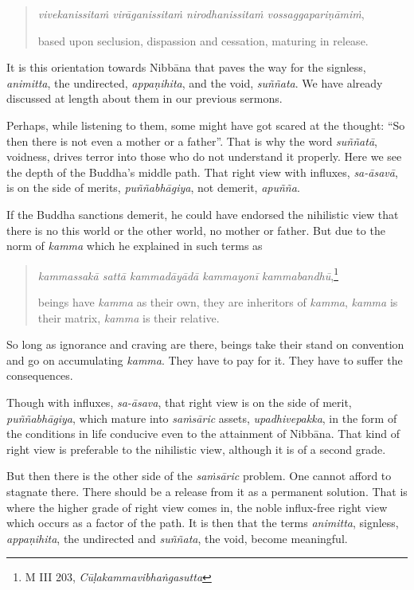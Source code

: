 \begin{quote}
\emph{vivekanissitaṁ virāganissitaṁ nirodhanissitaṁ vossaggapariṇāmiṁ},

based upon seclusion, dispassion and cessation, maturing in release.
\end{quote}

It is this orientation towards Nibbāna that paves the way for the signless, \emph{animitta}, the undirected, \emph{appaṇihita}, and the void, \emph{suññata}. We have already discussed at length about them in our previous sermons.

Perhaps, while listening to them, some might have got scared at the thought: ``So then there is not even a mother or a father''. That is why the word \emph{suññatā}, voidness, drives terror into those who do not understand it properly. Here we see the depth of the Buddha's middle path. That right view with influxes, \emph{sa-āsavā}, is on the side of merits, \emph{puññabhāgiya}, not demerit, \emph{apuñña}.

If the Buddha sanctions demerit, he could have endorsed the nihilistic view that there is no this world or the other world, no mother or father. But due to the norm of \emph{kamma} which he explained in such terms as

\begin{quote}
\emph{kammassakā sattā kammadāyādā kammayonī kammabandhū},\footnote{M III 203, \emph{Cūḷakammavibhaṅgasutta}}

beings have \emph{kamma} as their own, they are inheritors of \emph{kamma}, \emph{kamma} is their matrix, \emph{kamma} is their relative.
\end{quote}

So long as ignorance and craving are there, beings take their stand on convention and go on accumulating \emph{kamma}. They have to pay for it. They have to suffer the consequences.

Though with influxes, \emph{sa-āsava}, that right view is on the side of merit, \emph{puññabhāgiya}, which mature into \emph{saṁsāric} assets, \emph{upadhivepakka}, in the form of the conditions in life conducive even to the attainment of Nibbāna. That kind of right view is preferable to the nihilistic view, although it is of a second grade.

But then there is the other side of the \emph{saṁsāric} problem. One cannot afford to stagnate there. There should be a release from it as a permanent solution. That is where the higher grade of right view comes in, the noble influx-free right view which occurs as a factor of the path. It is then that the terms \emph{animitta}, signless, \emph{appaṇihita}, the undirected and \emph{suññata}, the void, become meaningful.

